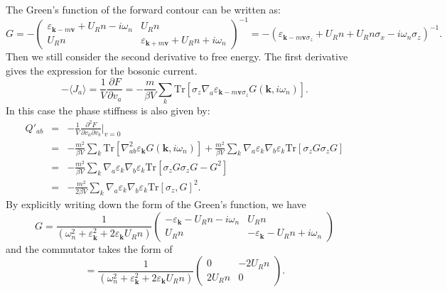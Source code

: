 \documentclass[aps,superscriptaddress,notitlepage,longbibliography]{revtex4-1}
\begin{document}
The Green's function of the forward contour can be written as: 
\begin{equation}
G=-\left(\begin{array}{cc}
\varepsilon_{\bm{k}-m\bm{v}}+U_{R}n-i\omega_{n} & U_{R}n\\
U_{R}n & \varepsilon_{\bm{k}+m\bm{v}}+U_{R}n+i\omega_{n}
\end{array}\right)^{-1}=-(\varepsilon_{\bm{k}-m\bm{v}\sigma_{z}}+U_{R}n+U_{R}n\sigma_{x}-i\omega_{n}\sigma_{z})^{-1}.
\end{equation}
Then we still consider the second derivative to free energy. The first
derivative gives the expression for the bosonic current. 
\begin{equation}
-\langle J_{a}\rangle=\frac{1}{V}\frac{\partial F}{\partial v_{a}}=-\frac{m}{\beta V}\sum_{k}\text{Tr}[\sigma_{z}\nabla_{a}\varepsilon_{\bm{k}-m\bm{v}\sigma_{z}}G(\bm{k},i\omega_{n})].
\end{equation}
In this case the phase stiffness is also given by: 
\begin{eqnarray}
Q'_{ab} & = & -\frac{1}{V}\frac{\partial^{2}F}{\partial v_{a}\partial v_{b}}|_{v=0}\nonumber \\
 & = & -\frac{m^{2}}{\beta V}\sum_{k}\text{Tr}[\nabla_{ab}^{2}\varepsilon_{\bm{k}}G(\bm{k},i\omega_{n})]+\frac{m^{2}}{\beta V}\sum_{k}\nabla_{a}\varepsilon_{k}\nabla_{b}\varepsilon_{k}\text{Tr}[\sigma_{z}G\sigma_{z}G]\\
 & = & -\frac{m^{2}}{\beta V}\sum_{k}\nabla_{a}\varepsilon_{k}\nabla_{b}\varepsilon_{k}\text{Tr}[\sigma_{z}G\sigma_{z}G-G^{2}]\nonumber \\
 & = & -\frac{m^{2}}{2\beta V}\sum_{k}\nabla_{a}\varepsilon_{k}\nabla_{b}\varepsilon_{k}\text{Tr}[\sigma_{z},G]^{2}.
\end{eqnarray}
By explicitly writing down the form of the Green's function, we have
\begin{equation}
G=\frac{1}{(\omega_{n}^{2}+\varepsilon_{\bm{k}}^{2}+2\varepsilon_{\bm{k}}U_{R}n)}\left(\begin{array}{cc}
-\varepsilon_{\bm{k}}-U_{R}n-i\omega_{n} & U_{R}n\\
U_{R}n & -\varepsilon_{\bm{k}}-U_{R}n+i\omega_{n}
\end{array}\right)
\end{equation}
and the commutator takes the form of 
\begin{equation}
[\sigma_{z},G]=\frac{1}{(\omega_{n}^{2}+\varepsilon_{\bm{k}}^{2}+2\varepsilon_{\bm{k}}U_{R}n)}\left(\begin{array}{cc}
0 & -2U_{R}n\\
2U_{R}n & 0
\end{array}\right).
\end{equation}
\end{document}

